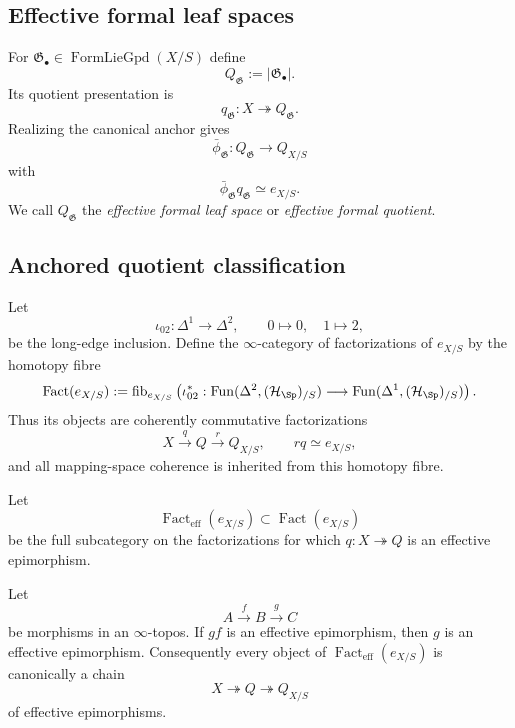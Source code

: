 \subsection{Effective formal leaf spaces}

\begin{definition}
\label{def:formal-leaf-space}
For
$\mathfrak G_\bullet\in\operatorname{FormLieGpd}(X/S)$ define
\[
    Q_{\mathfrak G}
    :=
    \lvert\mathfrak G_\bullet\rvert.
\]
Its quotient presentation is
\[
    q_{\mathfrak G}:
    X\twoheadrightarrow Q_{\mathfrak G}.
\]
Realizing the canonical anchor gives
\[
    \bar\phi_{\mathfrak G}:
    Q_{\mathfrak G}
    \longrightarrow
    Q_{X/S}
\]
with
\[
    \bar\phi_{\mathfrak G}q_{\mathfrak G}
    \simeq
    e_{X/S}.
\]
We call $Q_{\mathfrak G}$ the \emph{effective formal leaf space} or
\emph{effective formal quotient}.
\end{definition}

\subsection{Anchored quotient classification}

\begin{definition}
\label{def:infinitesimal-quotient-factorizations}
Let
\[
    \iota_{02}:\Delta^1\longrightarrow\Delta^2,
    \qquad
    0\longmapsto0,\quad 1\longmapsto2,
\]
be the long-edge inclusion.  Define the $\infty$-category of factorizations of
$e_{X/S}$ by the homotopy fibre
\[
    \operatorname{Fact}(e_{X/S})
    :=
    \operatorname{fib}_{e_{X/S}}
    \left(
        \iota_{02}^*:
        \operatorname{Fun}(\Delta^2,(\mathcal H_{\Sp})_{/S})
        \longrightarrow
        \operatorname{Fun}(\Delta^1,(\mathcal H_{\Sp})_{/S})
    \right).
\]
Thus its objects are coherently commutative factorizations
\[
    X\xrightarrow{q}Q\xrightarrow{r}Q_{X/S},
    \qquad
    rq\simeq e_{X/S},
\]
and all mapping-space coherence is inherited from this homotopy fibre.

Let
\[
    \operatorname{Fact}_{\mathrm{eff}}(e_{X/S})
    \subset
    \operatorname{Fact}(e_{X/S})
\]
be the full subcategory on the factorizations for which
$q:X\twoheadrightarrow Q$ is an effective epimorphism.
\end{definition}

\begin{lemma}
\label{lem:second-factor-effective}
Let
\[
    A\xrightarrow{f}B\xrightarrow{g}C
\]
be morphisms in an $\infty$-topos.  If $gf$ is an effective epimorphism, then
$g$ is an effective epimorphism.  Consequently every object of
$\operatorname{Fact}_{\mathrm{eff}}(e_{X/S})$ is canonically a chain
\[
    X\twoheadrightarrow Q\twoheadrightarrow Q_{X/S}
\]
of effective epimorphisms.
\end{lemma}

